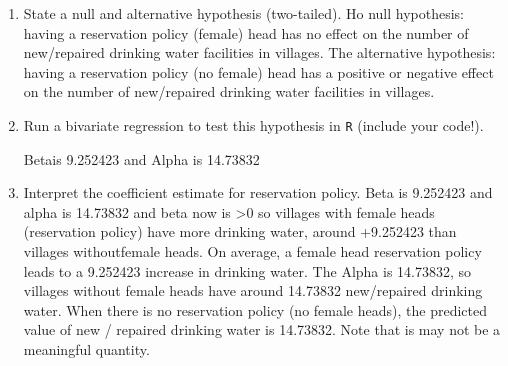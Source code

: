 \documentclass[12pt,letterpaper]{article}
\begin{document}
	\newpage
	\begin{enumerate}
		\item [(a)] State a null and alternative hypothesis (two-tailed).
		\newline
		\vspace{.25cm} Ho null hypothesis: having a reservation policy (female) head has no effect on the number of new/repaired drinking water facilities in villages. The alternative hypothesis: having a reservation policy (no female) head has a positive or negative effect on the number of new/repaired drinking water facilities in villages.
		
		
		\vspace{0.5cm}
		\item [(b)] Run a bivariate regression to test this hypothesis in \texttt{R} (include your code!).
		
		\vspace{1cm} Betais 9.252423 and Alpha is 14.73832
		\vspace{1cm}
		\item [(c)] Interpret the coefficient estimate for reservation policy.
		\newline
		\vspace{1cm}Beta is 9.252423 and alpha is 14.73832 and beta now is >0 so villages with female heads (reservation policy) have more drinking water, around +9.252423 than villages withoutfemale heads. On average, a female head reservation policy leads to a 9.252423 increase in drinking water. The Alpha is 14.73832, so villages without female heads have around 14.73832 new/repaired drinking water. When there is no reservation policy (no female heads), the predicted value of new / repaired drinking water is 14.73832. Note that is may not be a meaningful quantity.
	\end{enumerate}
	
	
\end{document}
